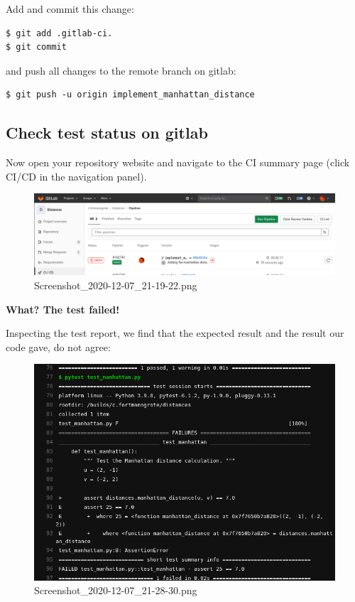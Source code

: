 \documentclass[11pt]{article}
\begin{document}
    Add and commit this change:

\begin{verbatim}
$ git add .gitlab-ci.
$ git commit
\end{verbatim}

and push all changes to the remote branch on gitlab:

\begin{verbatim}
$ git push -u origin implement_manhattan_distance
\end{verbatim}

    \hypertarget{check-test-status-on-gitlab}{%
\subsection{Check test status on
gitlab}\label{check-test-status-on-gitlab}}

Now open your repository website and navigate to the CI summary page
(click CI/CD in the navigation panel).

\begin{figure}
\centering
\includegraphics{static/test_gitlab.png}
\caption{Screenshot\_2020-12-07\_21-19-22.png}
\end{figure}

\textbf{What? The test failed!}

    Inspecting the test report, we find that the expected result and the
result our code gave, do not agree:

\begin{figure}
\centering
\includegraphics{static/failure_gitlab.png}
\caption{Screenshot\_2020-12-07\_21-28-30.png}
\end{figure}
\end{document}
